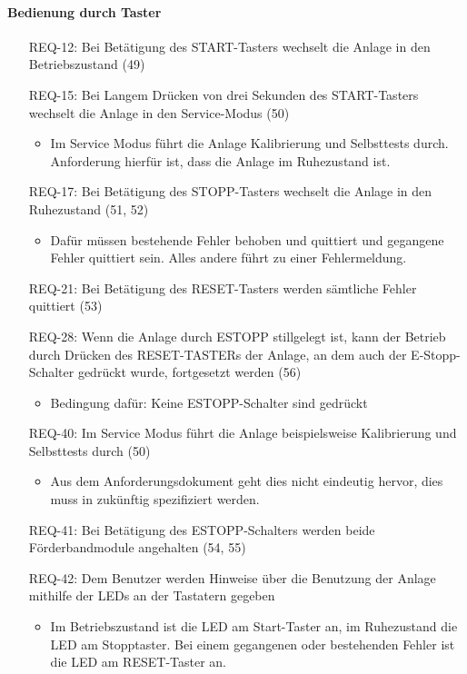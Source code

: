 \paragraph{Bedienung durch Taster}
\begin{itemize}
    \item[REQ-12:] Bei Betätigung des START-Tasters wechselt die Anlage in den Betriebszustand (49)
    \item[REQ-15:] Bei Langem Drücken von drei Sekunden des START-Tasters wechselt die Anlage in den Service-Modus (50)
    \begin{itemize}
        \item Im Service Modus führt die Anlage Kalibrierung und Selbsttests durch.
        Anforderung hierfür ist, dass die Anlage im Ruhezustand ist.
    \end{itemize}
    \item[REQ-17:] Bei Betätigung des STOPP-Tasters wechselt die Anlage in den Ruhezustand (51, 52)
    \begin{itemize}
        \item Dafür müssen bestehende Fehler behoben und quittiert und gegangene Fehler quittiert sein.
        Alles andere führt zu einer Fehlermeldung.
    \end{itemize}
    \item[REQ-21:] Bei Betätigung des RESET-Tasters werden sämtliche Fehler quittiert (53)
    \item[REQ-28:] Wenn die Anlage durch ESTOPP stillgelegt ist, kann der Betrieb durch Drücken des
    RESET-TASTERs der Anlage, an dem auch der E-Stopp-Schalter gedrückt wurde, fortgesetzt werden (56)
    \begin{itemize}
        \item Bedingung dafür: Keine ESTOPP-Schalter sind gedrückt
    \end{itemize}
    \item[REQ-40:] Im Service Modus führt die Anlage beispielsweise Kalibrierung und Selbsttests durch (50)
    \begin{itemize}
        \item Aus dem Anforderungsdokument geht dies nicht eindeutig hervor, dies muss in zukünftig spezifiziert werden.
    \end{itemize}
    \item[REQ-41:] Bei Betätigung des ESTOPP-Schalters werden beide Förderbandmodule angehalten (54, 55)
    \item[REQ-42:] Dem Benutzer werden Hinweise über die Benutzung der Anlage mithilfe der LEDs an der Tastatern gegeben
    \begin{itemize}
        \item Im Betriebszustand ist die LED am Start-Taster an, im Ruhezustand die LED am Stopptaster.
        Bei einem gegangenen oder bestehenden Fehler ist die LED am RESET-Taster an.
    \end{itemize}
\end{itemize}

